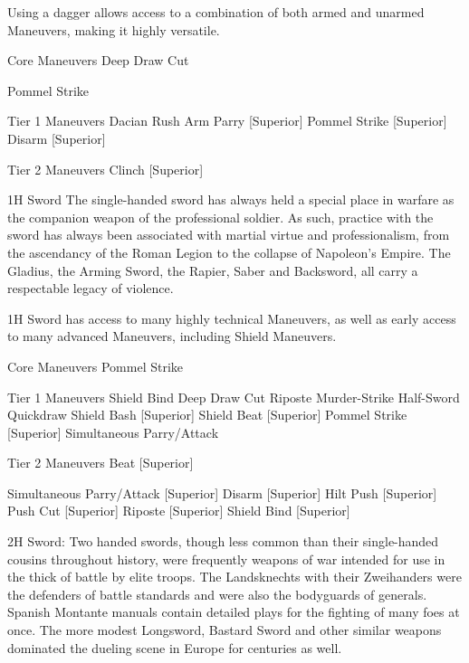 \documentclass[oneside,11pt,english]{book}
\begin{document}
 

Using a dagger allows access to a combination of both armed and unarmed Maneuvers, making it highly 
versatile. 

 

Core Maneuvers 
Deep Draw Cut 

 

Pommel Strike 

 

Tier 1 Maneuvers 
Dacian Rush 
Arm Parry [Superior] 
Pommel Strike [Superior] 
Disarm [Superior] 

 

Tier 2 Maneuvers 
Clinch [Superior] 

 

1H Sword 
The single-handed sword has always held a special place in warfare as the companion weapon of the 
professional soldier. As such, practice with the sword has always been associated with martial virtue and 
professionalism, from the ascendancy of the Roman Legion to the collapse of Napoleon’s Empire. The 
Gladius, the Arming Sword, the Rapier, Saber and Backsword, all carry a respectable legacy of violence. 

 

1H Sword has access to many highly technical Maneuvers, as well as early access to many advanced 
Maneuvers, including Shield Maneuvers. 

 

Core Maneuvers 
Pommel Strike 

 

Tier 1 Maneuvers 
Shield Bind 
Deep Draw Cut 
Riposte 
Murder-Strike 
Half-Sword 
Quickdraw 
Shield Bash [Superior] 
Shield Beat [Superior] 
Pommel Strike [Superior] 
Simultaneous Parry/Attack 

 

Tier 2 Maneuvers 
Beat [Superior] 


Simultaneous Parry/Attack [Superior] 
Disarm [Superior] 
Hilt Push [Superior] 
Push Cut [Superior] 
Riposte [Superior] 
Shield Bind [Superior] 

 

2H Sword: Two handed swords, though less common than their single-handed cousins throughout 
history, were frequently weapons of war intended for use in the thick of battle by elite troops. The 
Landsknechts with their Zweihanders were the defenders of battle standards and were also the bodyguards 
of generals. Spanish Montante manuals contain detailed plays for the fighting of many foes at once. The 
more modest Longsword, Bastard Sword and other similar weapons dominated the dueling scene in 
Europe for centuries as well. 
\end{document}

